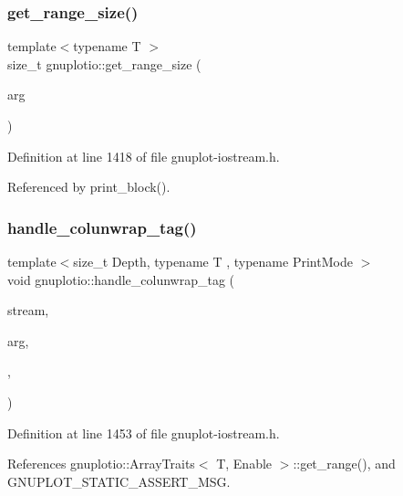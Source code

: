 \subsubsection{\texorpdfstring{get\+\_\+range\+\_\+size()}{get\_range\_size()}}
{\footnotesize\ttfamily template$<$typename T $>$ \\
size\+\_\+t gnuplotio\+::get\+\_\+range\+\_\+size (\begin{DoxyParamCaption}\item[{const T \&}]{arg }\end{DoxyParamCaption})}



Definition at line 1418 of file gnuplot-\/iostream.\+h.



Referenced by print\+\_\+block().

\mbox{\label{namespacegnuplotio_aef147f3d42f3f2c89cc4c895b8494150}} 
\subsubsection{\texorpdfstring{handle\+\_\+colunwrap\+\_\+tag()}{handle\_colunwrap\_tag()}\hspace{0.1cm}{\footnotesize\ttfamily [1/2]}}
{\footnotesize\ttfamily template$<$size\+\_\+t Depth, typename T , typename Print\+Mode $>$ \\
void gnuplotio\+::handle\+\_\+colunwrap\+\_\+tag (\begin{DoxyParamCaption}\item[{std\+::ostream \&}]{stream,  }\item[{const T \&}]{arg,  }\item[{\hyperlink{structgnuplotio_1_1_col_unwrap_no}{Col\+Unwrap\+No}}]{,  }\item[{Print\+Mode}]{ }\end{DoxyParamCaption})}



Definition at line 1453 of file gnuplot-\/iostream.\+h.



References gnuplotio\+::\+Array\+Traits$<$ T, Enable $>$\+::get\+\_\+range(), and G\+N\+U\+P\+L\+O\+T\+\_\+\+S\+T\+A\+T\+I\+C\+\_\+\+A\+S\+S\+E\+R\+T\+\_\+\+M\+SG.

